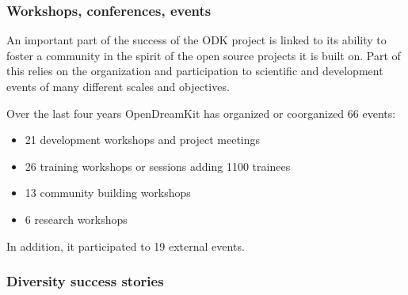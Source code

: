 \subsubsection{Workshops, conferences, events}


An important part of the success of the ODK project is linked to its
ability to foster a community in the spirit of the open source
projects it is built on. Part of this relies on the organization and
participation to scientific and development events of many different
scales and objectives.

Over the last four years OpenDreamKit has organized or coorganized 66
events:
\begin{itemize}
\item 21 development workshops and project meetings
\item 26 training workshops or sessions adding 1100 trainees
\item 13 community building workshops
\item 6 research workshops
\end{itemize}
In addition, it participated to 19 external events.

\subsubsection{Diversity success stories}

